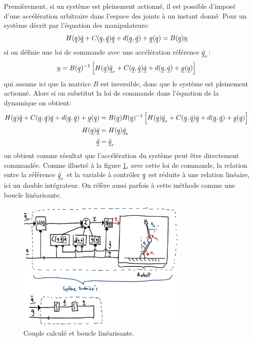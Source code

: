 Premièrement, si un système est pleinement actionné, il est possible d'imposé d'une accélération arbitraire dans l'espace des joints à un instant donné. Pour un système décrit par l'équation des manipulateurs:
\begin{align}
H(\underline{q}) \underline{\ddot{q}} + C(\underline{q},\underline{\dot{q}}) \underline{\dot{q}} + d(\underline{q}, \underline{\dot{q}}) + \underline{g}(\underline{q}) = B(\underline{q}) \underline{u} 
\end{align}
si on définie une loi de commande avec une accélération référence $\underline{\ddot{q}}_r$:
\begin{align}
\underline{u} = B(\underline{q})^{-1} \left[  H(\underline{q}) \underline{\ddot{q}}_r + C(\underline{q},\underline{\dot{q}}) \underline{\dot{q}} + d(\underline{q}, \underline{\dot{q}}) + \underline{g}(\underline{q}) \right]
\end{align}
qui assume ici que la matrice $B$ est inversible, donc que le système est pleinement actionné. Alors si on substitut la loi de commande dans l'équation de la dynamique on obtient:
\begin{align}
H(\underline{q}) \underline{\ddot{q}} + C(\underline{q},\underline{\dot{q}}) \underline{\dot{q}} + d(\underline{q}, \underline{\dot{q}}) + \underline{g}(\underline{q}) &= B(\underline{q}) B(\underline{q})^{-1} \left[  H(\underline{q}) \underline{\ddot{q}}_r + C(\underline{q},\underline{\dot{q}}) \underline{\dot{q}} + d(\underline{q}, \underline{\dot{q}}) + \underline{g}(\underline{q}) \right]  \\
H(\underline{q}) \underline{\ddot{q}} &= H(\underline{q}) \underline{\ddot{q}}_r \\
\underline{\ddot{q}} &= \underline{\ddot{q}}_r
\end{align}
on obtient comme résultat que l'accélération du système peut être directement commandée. Comme illustré à la figure \ref{fig:computedtorque}, avec cette loi de commande, la relation entre la référence $\underline{\ddot{q}}_r$ et la variable à contrôler $\underline{q}$ est réduite à une relation linéaire, ici un double intégrateur. On réfère aussi parfois à cette méthode comme une boucle linéarisante.

\begin{figure}[htp]
	\centering
		\includegraphics[width=0.75\textwidth]{fig/computedtorque.jpg}
	\caption{Couple calculé et boucle linéarisante.}
	\label{fig:computedtorque}
\end{figure}

